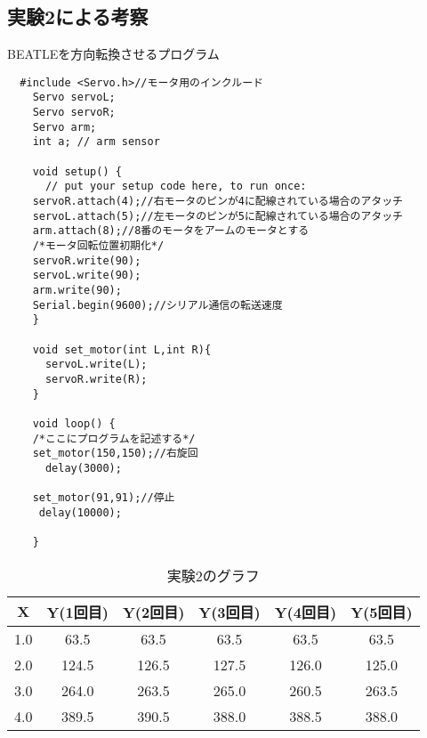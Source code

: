 \documentclass{jsarticle}
\begin{document}
\subsection{実験2による考察}
BEATLEを方向転換させるプログラム
  \begin{verbatim}
  #include <Servo.h>//モータ用のインクルード
    Servo servoL;
    Servo servoR;
    Servo arm;
    int a; // arm sensor

    void setup() {
      // put your setup code here, to run once:
    servoR.attach(4);//右モータのピンが4に配線されている場合のアタッチ
    servoL.attach(5);//左モータのピンが5に配線されている場合のアタッチ
    arm.attach(8);//8番のモータをアームのモータとする
    /*モータ回転位置初期化*/
    servoR.write(90);
    servoL.write(90);
    arm.write(90);
    Serial.begin(9600);//シリアル通信の転送速度
    }

    void set_motor(int L,int R){
      servoL.write(L);
      servoR.write(R);
    }

    void loop() {
    /*ここにプログラムを記述する*/
    set_motor(150,150);//右旋回
      delay(3000);

    set_motor(91,91);//停止
     delay(10000);

    }
  \end{verbatim}
\begin{table}[htbp]
  \begin{center}
      \caption{実験2のグラフ}
          \begin{tabular}{c|c|c|c|c|c}
            \hline
            X & Y(1回目) & Y(2回目) & Y(3回目) & Y(4回目) & Y(5回目) \\ \hline \hline
            1.0 & 63.5 & 63.5 & 63.5 & 63.5 & 63.5 \\
            2.0 & 124.5 & 126.5 & 127.5 & 126.0 & 125.0 \\
            3.0 & 264.0 & 263.5 & 265.0 & 260.5 & 263.5 \\
            4.0 & 389.5 & 390.5 & 388.0 & 388.5 & 388.0  \\
            \hline
          \end{tabular}
  \end{center}
\end{table}
\end{document}
